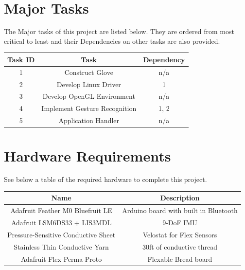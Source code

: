 \documentclass[12pt,a4paper,oneside]{book}
\theoremstyle{plain}
\numberwithin{equation}{chapter}
\newcounter{Secnum}
\begin{document}
\section{Major Tasks}

\noindent The Major tasks of this project are listed below. They are ordered from most critical to least and their Dependencies on other tasks are also provided.

\begin{center}
    \begin{tabular}{ |c|c|c| }
        \hline
        Task ID & Task & Dependency \\
        \hline
        \hline
        1 & Construct Glove & n/a \\
        \hline
        2 & Develop Linux Driver & 1 \\
        \hline
        3 & Develop OpenGL Environment & n/a \\
        \hline
        4 & Implement Gesture Recognition & 1, 2 \\
        \hline
        5 & Application Handler & n/a \\
        \hline
    \end{tabular}
\end{center}



\newpage

\section{Hardware Requirements}

\noindent See below a table of the required hardware to complete this project.


\begin{center}
    \begin{tabular}{ |c|c| }
        \hline
        Name & Description \\
        \hline
        \hline
        Adafruit Feather M0 Bluefruit LE & Arduino board with built in Bluetooth \\
        \hline
        Adafruit LSM6DS33 + LIS3MDL & 9-DoF IMU \\
        \hline
        Pressure-Sensitive Conductive Sheet & Velostat for Flex Sensors \\
        \hline
        Stainless Thin Conductive Yarn & 30ft of conductive thread \\
        \hline
        Adafruit Flex Perma-Proto & Flexable Bread board \\
        \hline
    \end{tabular}
\end{center}
\end{document}
